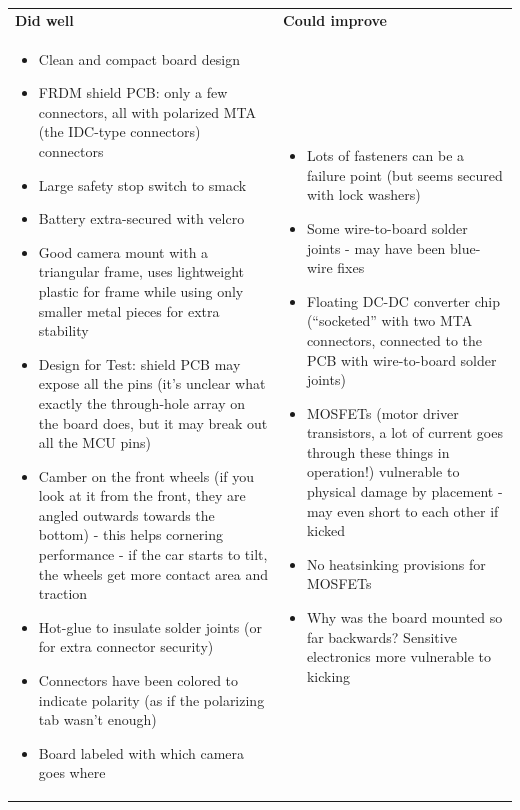 \documentclass{article}
\begin{document}
\begin{tabularx}{\textwidth}{X X}
\textbf{Did well} & \textbf{Could improve} \\
\begin{itemize}
  \item Clean and compact board design
  \item FRDM shield PCB: only a few connectors, all with polarized MTA (the IDC-type connectors) connectors
  \item Large safety stop switch to smack
  \item Battery extra-secured with velcro
  \item Good camera mount with a triangular frame, uses lightweight plastic for frame while using only smaller metal pieces for extra stability
  \item Design for Test: shield PCB may expose all the pins (it's unclear what exactly the through-hole array on the board does, but it may break out all the MCU pins)
  \item Camber on the front wheels (if you look at it from the front, they are angled outwards towards the bottom) - this helps cornering performance - if the car starts to tilt, the wheels get more contact area and traction
  \item Hot-glue to insulate solder joints (or for extra connector security)
  \item Connectors have been colored to indicate polarity (as if the polarizing tab wasn't enough)
  \item Board labeled with which camera goes where
\end{itemize}
&
\begin{itemize}
  \item Lots of fasteners can be a failure point (but seems secured with lock washers)
  \item Some wire-to-board solder joints - may have been blue-wire fixes
  \item Floating DC-DC converter chip (``socketed'' with two MTA connectors, connected to the PCB with wire-to-board solder joints)
  \item MOSFETs (motor driver transistors, a lot of current goes through these things in operation!) vulnerable to physical damage by placement - may even short to each other if kicked
  \item No heatsinking provisions for MOSFETs
  \item Why was the board mounted so far backwards? Sensitive electronics more vulnerable to kicking
\end{itemize}
\end{tabularx}
\end{document}
